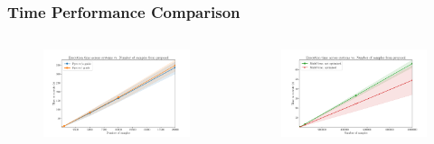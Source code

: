 \documentclass[usenames,dvipsnames]{beamer}
\begin{document}
\begin{frame}
  \frametitle{Time Performance Comparison}
  \begin{columns}
    \begin{column}{.48\textwidth}
      \begin{figure}[ht]
        \centering
        \includegraphics[width=1.0\textwidth,height=0.6\textheight]{figures/times0.pdf}
        \caption*{\label{fig:pyro-time}}
      \end{figure}
    \end{column}
    \begin{column}{.48\textwidth}
      \begin{figure}[ht]
        \centering
        \includegraphics[width=1.0\textwidth,height=0.6\textheight]{figures/times1.pdf}
        \caption*{\label{fig:multiverse-time}}
      \end{figure}
    \end{column}
  \end{columns}
\end{frame}
\end{document}
